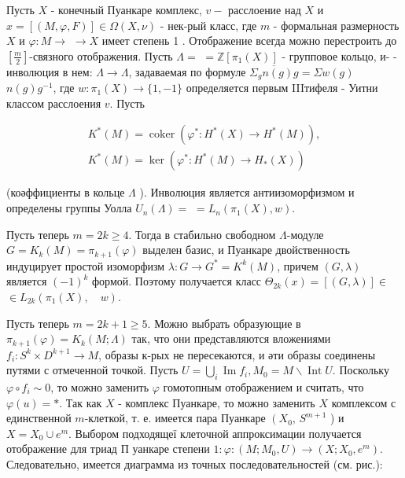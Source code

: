 \documentclass[10pt]{article}
\begin{document}
Пусть $X$ - конечный Пуанкаре комплекс, $v-$ расслоение над $X$ и $x=[(M, \varphi, F)] \in \Omega(X, \nu)$ - нек-рый класс, где $m$ - формальная размерность $X$ и $\varphi: M \rightarrow$ $\rightarrow X$ имеет степень 1 . Отображение всегда можно перестроить до $\left[\frac{m}{2}\right]$-связного отображения. Пусть $\Lambda=$ $=\mathbb{Z}\left[\pi_{1}(X)\right]$ - групповое кольцо, и- - инволюция в нем: $\Lambda \rightarrow \Lambda$, задаваемая по формуле $\overline{\Sigma_{g} n(g) g}=\Sigma w(g)$ $n(g) g^{-1}$, где $w: \pi_{1}(X) \rightarrow\{1,-1\}$ определяется первым IIIтифеля - Уитни классом расслоения $v$. Пусть



\[

\begin{gathered}

K^{*}(M)=\operatorname{coker}\left(\varphi^{*}: H^{*}(X) \longrightarrow H^{*}(M)\right), \\

K^{*}(M)=\operatorname{ker}\left(\varphi^{*}: H^{*}(M) \longrightarrow H_{*}(X)\right)

\end{gathered}

\]



(коәффициенты в кольце $\Lambda$ ). Инволюция является антиизоморфизмом и определены группы Уолла $U_{n}(\Lambda)=$ $=L_{n}\left(\pi_{1}(X), w\right)$.



Пусть теперь $m=2 k \geqslant 4$. Тогда в стабильно свободном $\Lambda$-модуле $G=K_{k}(M)=\pi_{k+1}(\varphi)$ выделен базис, и Пуанкаре двойственность индуцирует простой изоморфизм $\lambda: G \rightarrow G^{*}=K^{k}(M)$, причем $(G, \lambda)$ является $(-1)^{k}$ формой. Поэтому получается класс $\Theta_{2 k}(x)=[(G, \lambda)] \in$ $\in L_{2 k}\left(\pi_{1}(X), \quad w\right)$.



Пусть теперь $m=2 k+1 \geqslant 5$. Можно выбрать образующие в $\pi_{k+1}(\varphi)=K_{k}(M ; \Lambda)$ так, что они представляются вложениями $f_{i}: S^{k} \times D^{k+1} \rightarrow M$, образы к-рых не пересекаются, и әти образы соединены путями с отмеченной точкой. Пусть $U=\bigcup_{i} \operatorname{Im} f_{i}, M_{0}=M \backslash \operatorname{Int} U$. Поскольку $\varphi \circ f_{i} \sim 0$, то можно заменить $\varphi$ гомотопным отображением и считать, что $\varphi(u)=*$. Так как $X$ - комплекс Пуанкаре, то можно заменить $X$ комплексом с единственной $m$-клеткой, т. е. имеется пара Пуанкаре $\left(X_{0}\right.$, $S^{m+1}$ ) и $X=X_{0} \cup e^{m}$. Выбором подходящеї клеточной аппроксимации получается отображение для триад П уанкаре степени $1: \varphi:\left(M ; M_{0}, U\right) \rightarrow\left(X ; X_{0}, e^{m}\right)$. Следовательно, имеется диаграмма из точных последовательностей (см. рис.):
\end{document}
